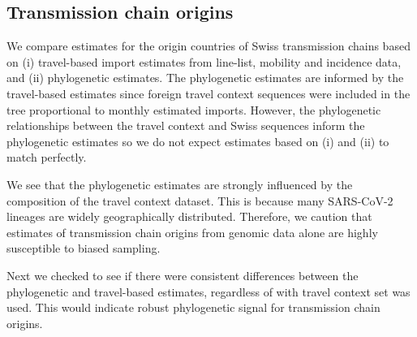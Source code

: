 \documentclass[9pt,twocolumn,twoside,lineno]{pnas-new}
\begin{document}

\subsection{Transmission chain origins}
We compare estimates for the origin countries of Swiss transmission chains based on (i) travel-based import estimates from line-list, mobility and incidence data, and (ii) phylogenetic estimates. The phylogenetic estimates are informed by the travel-based estimates since foreign travel context sequences were included in the tree proportional to monthly estimated imports. However, the phylogenetic relationships between the travel context and Swiss sequences inform the phylogenetic estimates so we do not expect estimates based on (i) and (ii) to match perfectly. 

We see that the phylogenetic estimates are strongly influenced by the composition of the travel context dataset. This is because many SARS-CoV-2 lineages are widely geographically distributed. Therefore, we caution that estimates of transmission chain origins from genomic data alone are highly susceptible to biased sampling.

Next we checked to see if there were consistent differences between the phylogenetic and travel-based estimates, regardless of with travel context set was used. This would indicate robust phylogenetic signal for transmission chain origins. 

\end{document}
